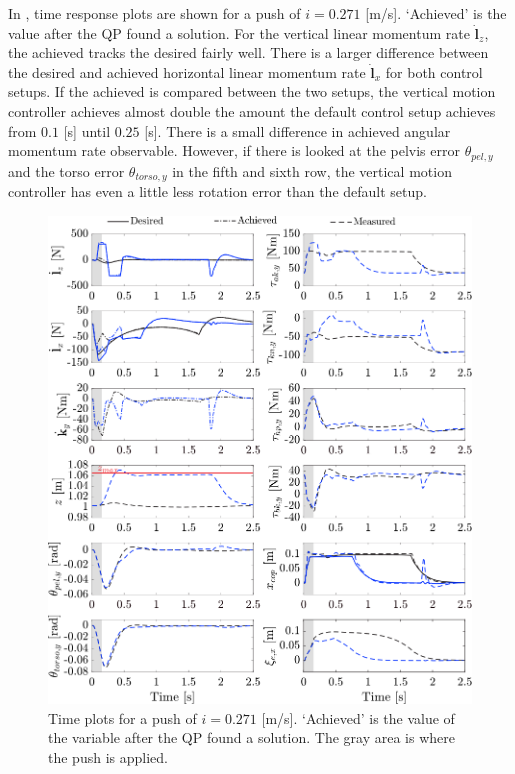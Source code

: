 In , time response plots are shown for a push of $i=0.271$ [m/s]. `Achieved' is the value after the \ac{QP} found a solution. For the vertical linear momentum rate $\dot{\mathbf{l}}_z$, the achieved tracks the desired fairly well. There is a larger difference between the desired and achieved horizontal linear momentum rate $\dot{\mathbf{l}}_x$ for both control setups. If the achieved is compared between the two setups, the vertical motion controller achieves almost double the amount the default control setup achieves from $0.1$ [s] until $0.25$ [s]. There is a small difference in achieved angular momentum rate observable. However, if there is looked at the pelvis error $\theta_{pel,y}$ and the torso error $\theta_{torso,y}$ in the fifth and sixth row, the vertical motion controller has even a little less rotation error than the default setup. 
\begin{figure}
\centering
\includegraphics[width=1.0\textwidth]{STYLESTUFF/valcomparetime.png}
\caption{Time plots for a push of $i=0.271$ [m/s]. `Achieved' is the value of the variable after the \ac{QP} found a solution. The gray area is where the push is applied.}
\label{fig:valcomparetime}
\end{figure}

